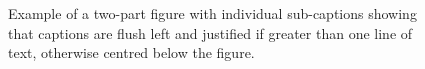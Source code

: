 \documentclass{gCOV2e}
\theoremstyle{plain}%
\theoremstyle{definition}
\theoremstyle{remark}
\begin{document}
\begin{figure}
\begin{center}
\hspace{5pt}
\caption{Example of a two-part figure with individual sub-captions
 showing that captions are flush left and justified if greater
 than one line of text, otherwise centred below the figure.}
\label{sample-figure}
\end{center}
\end{figure}
\end{document}
